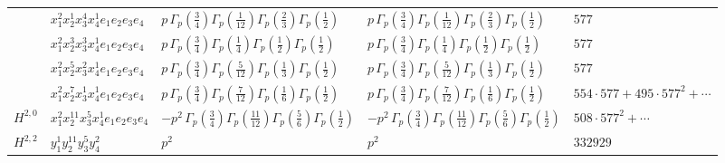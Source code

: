 \documentclass[11pt]{article}
\begin{document}
\begin{table}[ht]
{\begin{tabular}{@{}lllll@{}}
 & $x_{1}^{2} x_{2}^{1} x_{3}^{4} x_{4}^{1}  e_{1} e_{2} e_{3} e_{4}$ & $p \, \Gamma_p \left( \frac{3}{4} \right) \Gamma_p \left( \frac{1}{12} \right) \Gamma_p \left( \frac{2}{3} \right) \Gamma_p \left( \frac{1}{2} \right)$ & $p \, \Gamma_p \left( \frac{3}{4} \right) \Gamma_p \left( \frac{1}{12} \right) \Gamma_p \left( \frac{2}{3} \right) \Gamma_p \left( \frac{1}{2} \right)$ & $577$ \\
 & $x_{1}^{2} x_{2}^{3} x_{3}^{3} x_{4}^{1}  e_{1} e_{2} e_{3} e_{4}$ & $p \, \Gamma_p \left( \frac{3}{4} \right) \Gamma_p \left( \frac{1}{4} \right) \Gamma_p \left( \frac{1}{2} \right) \Gamma_p \left( \frac{1}{2} \right)$ & $p \, \Gamma_p \left( \frac{3}{4} \right) \Gamma_p \left( \frac{1}{4} \right) \Gamma_p \left( \frac{1}{2} \right) \Gamma_p \left( \frac{1}{2} \right)$ & $577$ \\
 & $x_{1}^{2} x_{2}^{5} x_{3}^{2} x_{4}^{1}  e_{1} e_{2} e_{3} e_{4}$ & $p \, \Gamma_p \left( \frac{3}{4} \right) \Gamma_p \left( \frac{5}{12} \right) \Gamma_p \left( \frac{1}{3} \right) \Gamma_p \left( \frac{1}{2} \right)$ & $p \, \Gamma_p \left( \frac{3}{4} \right) \Gamma_p \left( \frac{5}{12} \right) \Gamma_p \left( \frac{1}{3} \right) \Gamma_p \left( \frac{1}{2} \right)$ & $577$ \\
 & $x_{1}^{2} x_{2}^{7} x_{3}^{1} x_{4}^{1}  e_{1} e_{2} e_{3} e_{4}$ & $p \, \Gamma_p \left( \frac{3}{4} \right) \Gamma_p \left( \frac{7}{12} \right) \Gamma_p \left( \frac{1}{6} \right) \Gamma_p \left( \frac{1}{2} \right)$ & $p \, \Gamma_p \left( \frac{3}{4} \right) \Gamma_p \left( \frac{7}{12} \right) \Gamma_p \left( \frac{1}{6} \right) \Gamma_p \left( \frac{1}{2} \right)$ & $554{\cdot}577{+}495{\cdot}577^{2}{+}\cdots$ \\
\midrule
$H^{2,0}$ & $x_{1}^{2} x_{2}^{11} x_{3}^{5} x_{4}^{1}  e_{1} e_{2} e_{3} e_{4}$ & $- p^{2} \, \Gamma_p \left( \frac{3}{4} \right) \Gamma_p \left( \frac{11}{12} \right) \Gamma_p \left( \frac{5}{6} \right) \Gamma_p \left( \frac{1}{2} \right)$ & $- p^{2} \, \Gamma_p \left( \frac{3}{4} \right) \Gamma_p \left( \frac{11}{12} \right) \Gamma_p \left( \frac{5}{6} \right) \Gamma_p \left( \frac{1}{2} \right)$ & $508{\cdot}577^{2}{+}\cdots$ \\
\midrule
$H^{2,2}$ & $y_{1}^{1} y_{2}^{11} y_{3}^{5} y_{4}^{2}$ & $p^{2} \,$ & $p^{2} \,$ & $332929$ \\
\bottomrule
\end{tabular}
}
\renewcommand{\arraystretch}{1.0}
\end{table}

\newpage
\end{document}
